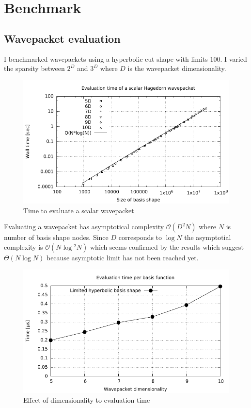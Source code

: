 \documentclass{article}
\begin{document}
\section{Benchmark}

\subsection{Wavepacket evaluation}

I benchmarked wavepackets using a hyperbolic cut shape with limits \(100\).
I varied the sparsity between \(2^D\) and \(3^D\) where \(D\) is the wavepacket
dimensionality.

\begin{figure}[H]
  \centering
  \includegraphics[width=1.0\textwidth]{plots/hawp_eval_benchmark}
  \caption{Time to evaluate a scalar wavepacket}
  \label{fig:hawp_eval_benchmark}
\end{figure}

Evaluating a wavepacket has asymptotical complexity \(\mathcal{O}(D^2N)\) where
\(N\) is number of basis shape nodes.
Since \(D\) corresponds to \(\log{}N\) the asymptotial complexity is \(\mathcal{O}(N\log{}^2N)\)
which seems confirmed by the results which suggest \(\Theta(N\log{}N)\) because asymptotic limit
has not been reached yet.

\begin{figure}[H]
  \centering
  \includegraphics[width=1.0\textwidth]{plots/hawp_eval_efficiency}
  \caption{Effect of dimensionality to evaluation time}
  \label{fig:hawp_eval_efficiency}
\end{figure}
\end{document}
